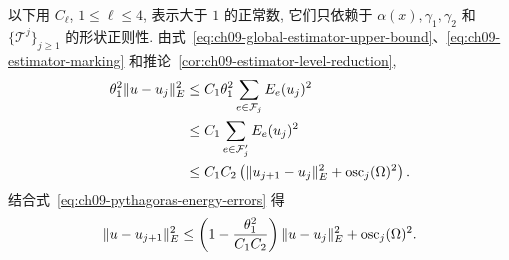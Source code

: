 \begin{Proof}
以下用 $C_\ell$, $1\leq\ell\leq4$, 表示大于 $1$ 的正常数, 它们只依赖于 $\alpha(x),\gamma_1,\gamma_2$ 和 $\{\mathcal T^j\}_{j\geq1}$ 的形状正则性. 由式~\eqref{eq:ch09-global-estimator-upper-bound}、\eqref{eq:ch09-estimator-marking} 和推论~\ref{cor:ch09-estimator-level-reduction},
\begin{align}
\MathBookFormulaID{formula-ch09-marked-estimator-reduction}
\label{eq:ch09-marked-estimator-reduction}
\theta_1^2\|u-u_j\|_E^2
&\leq C_1\theta_1^2\sum_{e\in\mathcal F_j}E_e(u_j)^2\notag\\
&\leq C_1\sum_{e\in\mathcal F_j'}E_e(u_j)^2\notag\\
&\leq C_1C_2\left(\|u_{j+1}-u_j\|_E^2
+\operatorname{osc}_j(\Omega)^2\right).
\end{align}
结合式~\eqref{eq:ch09-pythagoras-energy-errors} 得
\begin{equation}
\MathBookFormulaID{formula-ch09-energy-error-reduction}
\label{eq:ch09-energy-error-reduction}
\|u-u_{j+1}\|_E^2
\leq\left(1-\frac{\theta_1^2}{C_1C_2}\right)\|u-u_j\|_E^2
+\operatorname{osc}_j(\Omega)^2.
\end{equation}


\end{Proof}
